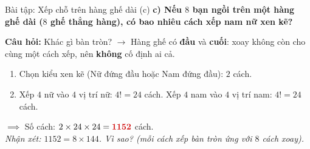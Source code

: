 \documentclass[12pt,a4paper]{article}
\begin{document}
\begin{baitap}{Bài tập: Xếp chỗ trên hàng ghế dài (c)}
\textbf{c) Nếu $8$ bạn ngồi trên một hàng ghế dài ($8$ ghế thẳng hàng), có bao nhiêu cách xếp nam nữ xen kẽ?}

\textbf{Câu hỏi:} Khác gì bàn tròn? $\rightarrow$ Hàng ghế có \textbf{đầu} và \textbf{cuối}: xoay không còn cho cùng một cách xếp, nên \textbf{không} cố định ai cả.

\begin{center}
\end{center}

\begin{enumerate}
  \item Chọn kiểu xen kẽ (Nữ đứng đầu hoặc Nam đứng đầu): $2$ cách.
  \item Xếp $4$ nữ vào $4$ vị trí nữ: $4! = 24$ cách. Xếp $4$ nam vào $4$ vị trí nam: $4! = 24$ cách.
\end{enumerate}
$\implies$ Số cách: $2 \times 24 \times 24 = \textcolor{AccentRed}{\mathbf{1152}}$ cách.\\
\textit{Nhận xét: $1152 = 8 \times 144$. Vì sao? (mỗi cách xếp bàn tròn ứng với $8$ cách xoay).}
\end{baitap}
\end{document}

